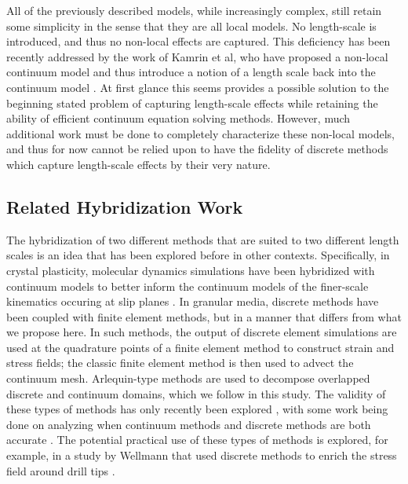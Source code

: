 All of the previously described models, while increasingly complex, still retain some simplicity in the sense that they are all local models. No length-scale is introduced, and thus no non-local effects are captured. This deficiency has been recently addressed by the work of Kamrin et al, who have proposed a non-local continuum model and thus introduce a notion of a length scale back into the continuum model \cite{Kamrin:2012:Nonlocal}. At first glance this seems provides a possible solution to the beginning stated problem of capturing length-scale effects while retaining the ability of efficient continuum equation solving methods. However, much additional work must be done to completely characterize these non-local models, and thus for now cannot be relied upon to have the fidelity of discrete methods which capture length-scale effects by their very nature.

\subsection{Related Hybridization Work}
The hybridization of two different methods that are suited to two different length scales is an idea that has been explored before in other contexts. Specifically, in crystal plasticity, molecular dynamics simulations have been hybridized with continuum models to better inform the continuum models of the finer-scale kinematics occuring at slip planes \cite{Tadmor:1996,Smith:2001,Shimokawa:2007,Zhang:2005,Dhia:1998}. In granular media, discrete methods have been coupled with finite element methods, but in a manner that differs from what we propose here. In such methods, the output of discrete element simulations are used at the quadrature points of a finite element method to construct strain and stress fields; the classic finite element method is then used to advect the continuum mesh. Arlequin-type methods are used to decompose overlapped discrete and continuum domains, which we follow in this study. The validity of these types of methods has only recently been explored \cite{Yan:2010}, with some work being done on analyzing when continuum methods and discrete methods are both accurate \cite{Rycroft:2009,Kamrin:2010,Kamrin:2014}. The potential practical use of these types of methods is explored, for example, in a study by Wellmann that used discrete methods to enrich the stress field around drill tips \cite{Wellmann:2012}.


